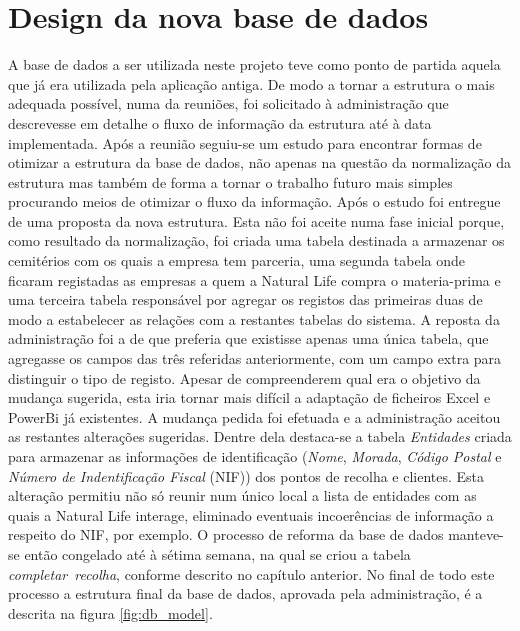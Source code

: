 \section{Design da nova base de dados}
A base de dados a ser utilizada neste projeto teve como ponto de partida aquela que já era utilizada pela aplicação antiga. De modo a tornar a estrutura o mais adequada possível, numa da reuniões, foi solicitado à administração que descrevesse em detalhe o fluxo de informação da estrutura até à data implementada. Após a reunião seguiu-se um estudo para encontrar formas de otimizar a estrutura da base de dados, não apenas na questão da normalização da estrutura mas também de forma a tornar o trabalho futuro mais simples procurando meios de otimizar o fluxo da informação. Após o estudo foi entregue de uma proposta da nova estrutura. Esta não foi aceite numa fase inicial porque, como resultado da normalização, foi criada uma tabela destinada a armazenar os cemitérios com os quais a empresa tem parceria, uma segunda tabela onde ficaram registadas as empresas a quem a Natural Life compra o materia-prima e uma terceira tabela responsável por agregar os registos das primeiras duas de modo a estabelecer as relações com a restantes tabelas do sistema. A reposta da administração foi a de que preferia que existisse apenas uma única tabela, que agregasse os campos das três referidas anteriormente, com um campo extra para distinguir o tipo de registo. Apesar de compreenderem qual era o objetivo da mudança sugerida, esta iria tornar mais difícil a adaptação de ficheiros Excel e PowerBi já existentes. A mudança pedida foi efetuada e a administração aceitou as restantes alterações sugeridas. Dentre dela destaca-se a tabela \textit{Entidades} criada para armazenar as informações de identificação (\textit{Nome}, \textit{Morada}, \textit{Código Postal} e \textit{Número de Indentificação Fiscal} (NIF\label{sym:NIF})) dos pontos de recolha e clientes. Esta alteração permitiu não só reunir num único local a lista de entidades com as quais a Natural Life interage, eliminado eventuais incoerências de informação a respeito do NIF, por exemplo.
O processo de reforma da base de dados manteve-se então congelado até à sétima semana, na qual se criou a tabela \textit{completar\ recolha}, conforme descrito no capítulo anterior. No final de todo este processo a estrutura final da base de dados, aprovada pela administração, é a descrita na figura \ref{fig:db_model}.

